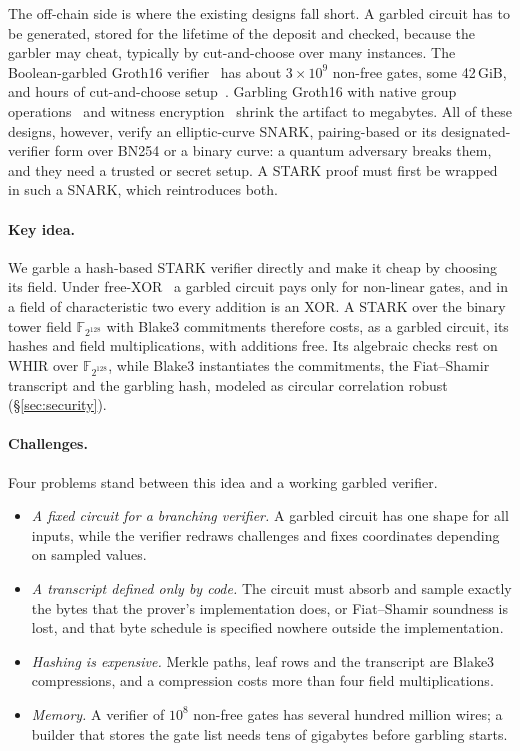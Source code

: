 \documentclass[11pt]{article}
\newcommand{\F}{\mathbb{F}_{2^{128}}}
\newcommand{\XOR}{\textsf{XOR}}
\begin{document}
The off-chain side is where the existing designs fall short. A garbled circuit
has to be generated, stored for the lifetime of the deposit and checked, because
the garbler may cheat, typically by cut-and-choose over many instances. The
Boolean-garbled Groth16 verifier~\cite{bit25b} has about $3\times10^9$ non-free
gates, some 42\,GiB, and hours of cut-and-choose setup~\cite{babe2026}. Garbling
Groth16 with native group operations~\cite{kflt26native} and witness
encryption~\cite{babe2026} shrink the artifact to megabytes. All of these
designs, however, verify an elliptic-curve SNARK, pairing-based or its
designated-verifier form over BN254 or a binary curve: a quantum adversary breaks
them, and they need a trusted or secret setup. A STARK proof must
first be wrapped in such a SNARK, which reintroduces both.

\paragraph{Key idea.} We garble a hash-based STARK verifier directly and make it
cheap by choosing its field. Under free-XOR~\cite{ks08} a garbled circuit pays
only for non-linear gates, and in a field of characteristic two every addition
is an \XOR. A STARK over the binary tower field $\F$ with Blake3 commitments
therefore costs, as a garbled circuit, its hashes and field multiplications,
with additions free. Its algebraic checks rest on WHIR over $\F$, while Blake3
instantiates the commitments, the Fiat--Shamir transcript and the garbling hash,
modeled as circular correlation robust (\S\ref{sec:security}).

\paragraph{Challenges.} Four problems stand between this idea and a working
garbled verifier.
\begin{itemize}
  \item[C1] \emph{A fixed circuit for a branching verifier.} A garbled circuit has
    one shape for all inputs, while the verifier redraws challenges and fixes
    coordinates depending on sampled values.
  \item[C2] \emph{A transcript defined only by code.} The circuit must absorb and
    sample exactly the bytes that the prover's implementation does, or Fiat--Shamir
    soundness is lost, and that byte schedule is specified nowhere outside the
    implementation.
  \item[C3] \emph{Hashing is expensive.} Merkle paths, leaf rows and the transcript
    are Blake3 compressions, and a compression costs more than four field
    multiplications.
  \item[C4] \emph{Memory.} A verifier of $10^8$ non-free gates has several
    hundred million wires; a builder that stores the gate list needs tens of
    gigabytes before garbling starts.
\end{itemize}
\end{document}

